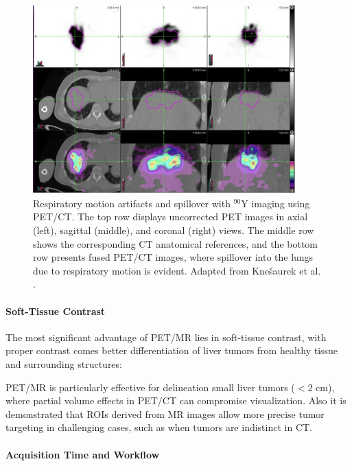 \documentclass[11pt]{article} %
\begin{document}
\begin{multicols}{2}
\begin{figure}[ht]
\centering
\includegraphics[width=0.9\textwidth]{assets/Respiratory_Motion_Artifacts.png} 
\caption{Respiratory motion artifacts and spillover with \(^{90}\text{Y}\) imaging using PET/CT. The top row displays uncorrected PET images in axial (left), sagittal (middle), and coronal (right) views. The middle row shows the corresponding CT anatomical references, and the bottom row presents fused PET/CT images, where spillover into the lungs due to respiratory motion is evident. Adapted from Knešaurek et al. \cite{knesaurek2018}.}
\label{fig:respiratory_motion_artifacts}
\end{figure}



\paragraph{Soft-Tissue Contrast}

The most significant advantage of PET/MR lies in soft-tissue contrast, with proper contrast comes better differentiation of liver tumors from healthy tissue and surrounding structures:

PET/MR is particularly effective for delineation small liver tumors ($<$2 cm), where partial volume effects in PET/CT can compromise visualization. \cite{knesaurek2018} Also it is demonstrated that ROIs derived from MR images allow more precise tumor targeting in challenging cases, such as when tumors are indistinct in CT. %
	

\paragraph{Acquisition Time and Workflow}


\end{multicols}
\end{document}
